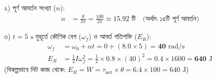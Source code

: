 \documentclass[12pt, a4paper]{article}
\begin{document}
\begin{tcolorbox}[solutionbox={সমাধান (Solution)}]
২) পূর্ণ আবর্তন সংখ্যা ($n$):
\begin{align*}
    n &= \frac{\theta}{2\pi} = \frac{100}{2\pi} \approx \mathbf{15.92}\text{ টি} \quad \text{(অর্থাৎ ১৫টি পূর্ণ আবর্তন)}
\end{align*}

৩) $t = 5\text{ s}$ মুহূর্তে কৌণিক বেগ ($\omega_f$) ও আবর্ত গতিশক্তি ($E_R$):
\begin{align*}
    \omega_f &= \omega_0 + \alpha t = 0 + (8.0 \times 5) = \mathbf{40}\text{ rad/s} \\
    E_R &= \frac{1}{2} I \omega_f^2 = \frac{1}{2} \times 0.8 \times (40)^2 = 0.4 \times 1600 = \mathbf{640}\text{ J}
\end{align*}
(বিকল্পভাবে নিট কাজ থেকে: $E_R = W = \tau_{\text{net}} \times \theta = 6.4 \times 100 = 640\text{ J}$)
\end{tcolorbox}
\end{document}

